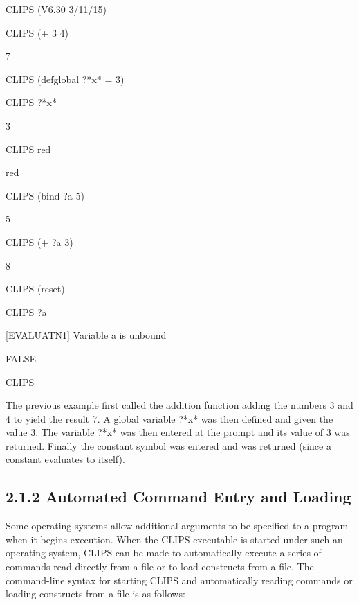 \documentclass[letterpaper,10pt,english]{sphinxmanual}
\begin{document}
\begin{sphinxVerbatim}[commandchars=\\\{\}]
CLIPS (V6.30 3/11/15)

CLIPS\PYGZgt{} (+ 3 4)

7

CLIPS\PYGZgt{} (defglobal ?*x\PYGZbs{}* = 3)

CLIPS\PYGZgt{} ?*x\PYGZbs{}*

3

CLIPS\PYGZgt{} red

red

CLIPS\PYGZgt{} (bind ?a 5)

5

CLIPS\PYGZgt{} (+ ?a 3)

8

CLIPS\PYGZgt{} (reset)

CLIPS\PYGZgt{} ?a

[EVALUATN1] Variable a is unbound

FALSE

CLIPS\PYGZgt{}
\end{sphinxVerbatim}

The previous example first called the addition function adding the
numbers 3 and 4 to yield the result 7. A global variable ?*x* was then
defined and given the value 3. The variable ?*x* was then entered at
the prompt and its value of 3 was returned. Finally the constant symbol
 was entered and was returned (since a constant evaluates to
itself).


\subsection{2.1.2 Automated Command Entry and Loading}
\label{\detokenize{overview:automated-command-entry-and-loading}}
Some operating systems allow additional arguments to be specified to a
program when it begins execution. When the CLIPS executable is started
under such an operating system, CLIPS can be made to automatically
execute a series of commands read directly from a file or to load
constructs from a file. The command-line syntax for starting CLIPS and
automatically reading commands or loading constructs from a file is as
follows:


\begin{sphinxVerbatim}[commandchars=\\\{\}]
 

    

  

 
\end{sphinxVerbatim}
\end{document}

